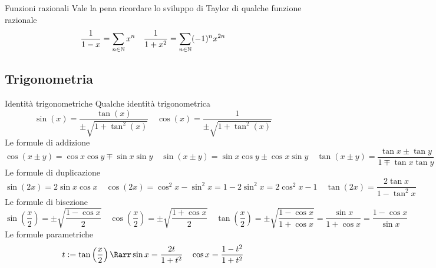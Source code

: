 \documentclass{article}
\begin{document}
\begin{example}{Funzioni razionali}{}
    Vale la pena ricordare lo sviluppo di Taylor di qualche funzione razionale
    \[\frac{1}{1-x} = \sum_{n\in\mathbb{N}} x^n \quad \frac{1}{1+x^2} = \sum_{n\in\mathbb{N}} (-1)^n x^{2n}\]
\end{example}

\subsection{Trigonometria}

\begin{example}{Identità trigonometriche}{}
    Qualche identità trigonometrica 
    \[\sin(x) = \frac{\tan(x)}{\pm\sqrt{1+\tan^2(x)}} \quad \cos(x) = \frac{1}{\pm\sqrt{1+\tan^2(x)}}\]
    Le formule di addizione
    \[\cos(x\pm y) = \cos x \cos y \mp \sin x \sin y \quad \sin(x\pm y) = \sin x \cos y \pm \cos x \sin y \quad \tan(x \pm y) = \frac{\tan x \pm \tan y}{1 \mp \tan x \tan y}\]
    Le formule di duplicazione
    \[\sin(2x) = 2\sin x \cos x \quad \cos(2x) = \cos^2 x - \sin^2 x = 1-2\sin^2 x = 2\cos^2 x -1 \quad \tan(2x) = \frac{2\tan x}{1- \tan^2 x}\]
    Le formule di bisezione
    \[\sin\left(\frac{x}{2}\right) = \pm\sqrt{\frac{1-\cos x}{2}} \quad \cos\left(\frac{x}{2}\right) = \pm\sqrt{\frac{1+\cos x}{2}} \quad \tan\left(\frac{x}{2}\right) = \pm\sqrt{\frac{1-\cos x}{1+\cos x}} = \frac{\sin x}{1 + \cos x} = \frac{1 - \cos x}{\sin x}\]
    Le formule parametriche
    \[t := \tan \left(\frac{x}{2}\right) \Rarr \sin x = \frac{2 t}{1 + t^2} \quad \cos x = \frac{1 - t^2}{1+t^2}\]
\end{example}
\end{document}
